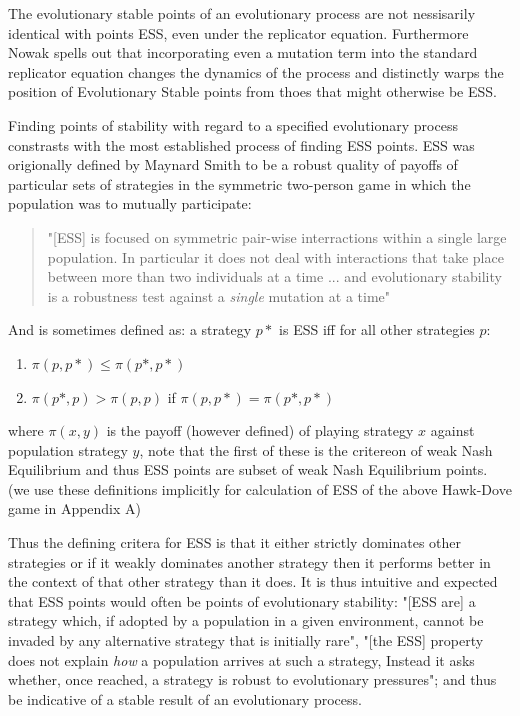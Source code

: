 \documentclass[journal,article,accept,oneauthors,pdftex,10pt,a4paper]{mdpi}
\begin{document}
The evolutionary stable points of an evolutionary process are not nessisarily identical with points ESS, even under the replicator equation.\cite{replicator1}
Furthermore Nowak spells out that incorporating even a mutation term into the standard replicator equation changes the dynamics of the process and distinctly warps the position of Evolutionary Stable points from thoes that might otherwise be ESS.\cite{nowak}

Finding points of stability with regard to a specified evolutionary process constrasts with the most established process of finding ESS points.
ESS was origionally defined by Maynard Smith\cite{maynard}\cite{maynard2} to be a robust quality of payoffs of particular sets of strategies in the symmetric two-person game in which the population was to mutually participate:
\begin{quote}"[ESS] is focused on symmetric pair-wise interractions within a single large population. In particular it does not deal with interactions that take place between more than two individuals at a time ... and evolutionary stability is a robustness test against a \textit{single} mutation at a time"\cite{weibull}\end{quote}
And is sometimes defined as\cite{replicator1}\cite{weibull}: a strategy $p*$ is ESS iff for all other strategies $p$:
\begin{enumerate}[leftmargin=*,labelsep=3mm]
\item	$\pi(p,p*)\le \pi(p*,p*)$
\item	$\pi(p*,p)>\pi(p,p)$ if $\pi(p,p*) = \pi(p*,p*)$
\end{enumerate}
where $\pi(x,y)$ is the payoff (however defined) of playing strategy $x$ against population strategy $y$, note that the first of these is the critereon of weak Nash Equilibrium and thus ESS points are subset of weak Nash Equilibrium points. (we use these definitions implicitly for calculation of ESS of the above Hawk-Dove game in Appendix A)

Thus the defining critera for ESS is that it either strictly dominates other strategies or if it weakly dominates another strategy then it performs better in the context of that other strategy than it does. It is thus intuitive and expected that ESS points would often be points of evolutionary stability: "[ESS are] a strategy which, if adopted by a population in a given environment, cannot be invaded by any alternative strategy that is initially rare"\cite{gloss1}\cite{maynard}, "[the ESS] property does not explain \textit{how} a population arrives at such a strategy, Instead it asks whether, once reached, a strategy is robust to evolutionary pressures"\cite{weibull}; and thus be indicative of a stable result of an evolutionary process.
\end{document}
